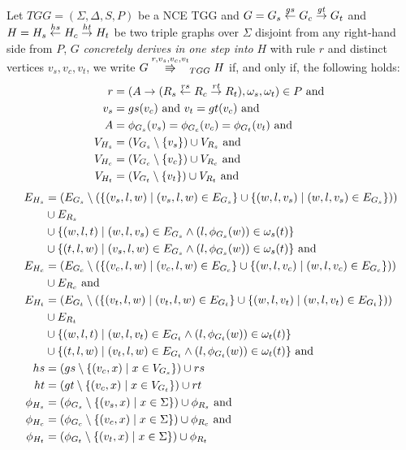 \begin{definition}
	\label{def:tgg_dstep}
	Let $TGG = (\Sigma, \Delta, S, P)$ be a NCE TGG and $G = G_s \overset{gs}{\leftarrow} G_c \overset{gt}{\rightarrow} G_t$ and $H = H_s \overset{hs}{\leftarrow} H_c \overset{ht}{\rightarrow} H_t$ be two triple graphs over $\Sigma$ disjoint from any right-hand side from $P$, $G$ \emph{concretely derives in one step into} $H$ with rule $r$ and distinct vertices $v_s, v_c, v_t$, we write $G \tcderiv{r}{v_s,v_c,v_t}{TGG} H$ if, and only if, the following holds:
	\begin{align*}
		r & = (A \to (R_s \overset{rs}{\leftarrow} R_c \overset{rt}{\rightarrow} R_t), \omega_s, \omega_t) \in P \text{ and } \\
		v_s & = gs(v_c) \text{ and } v_t = gt(v_c) \text{ and}\\
		A & = \phi_{G_s}(v_s) = \phi_{G_c}(v_c) = \phi_{G_t}(v_t) \text{ and} \\
		V_{H_s}  & = (V_{G_s} \setminus \{v_s\}) \cup V_{R_s} \text{ and}\\
		V_{H_c}  & = (V_{G_c} \setminus \{v_c\}) \cup V_{R_c} \text{ and} \\
		V_{H_t}  & = (V_{G_t} \setminus \{v_t\}) \cup V_{R_t} \text{ and}
		\end{align*}
		\begin{align*}
		E_{H_s} & = (E_{G_s} \setminus (\{(v_s,l,w) \; | \; (v_s,l,w) \in E_{G_s}\} \cup \{(w,l,v_s) \; | \; (w,l,v_s) \in E_{G_s}\})) \\
		& \cup E_{R_s} \\
		& \cup \{(w,l,t) \; | \; (w,l,v_s) \in E_{G_s} \land (l,\phi_{G_s}(w)) \in \omega_{s}(t)\} \\
		& \cup \{(t,l,w) \; | \; (v_s,l,w) \in E_{G_s} \land (l,\phi_{G_s}(w)) \in \omega_{s}(t)\} \text{ and} \\
		E_{H_c} & = (E_{G_c} \setminus (\{(v_c,l,w) \; | \; (v_c,l,w) \in E_{G_c}\} \cup \{(w,l,v_c) \; | \; (w,l,v_c) \in E_{G_c}\})) \\
		& \cup E_{R_c} \text{ and} \\
		E_{H_t} & = (E_{G_t} \setminus (\{(v_t,l,w) \; | \; (v_t,l,w) \in E_{G_t}\} \cup \{(w,l,v_t) \; | \; (w,l,v_t) \in E_{G_t}\})) \\
		& \cup E_{R_t} \\
		& \cup \{(w,l,t) \; | \; (w,l,v_t) \in E_{G_t} \land (l,\phi_{G_t}(w)) \in \omega_{t}(t)\} \\
		& \cup \{(t,l,w) \; | \; (v_t,l,w) \in E_{G_t} \land (l,\phi_{G_t}(w)) \in \omega_{t}(t)\} \text{ and} \\
		hs		& = (gs \setminus \{(v_c,x) \; | \; x \in V_{G_s}\}) \cup rs  \\
		ht		& = (gt \setminus \{(v_c,x) \; | \; x \in V_{G_t}\}) \cup rt  \\
		\phi_{H_s} & = (\phi_{G_s} \setminus \{(v_s,x) \; | \; x \in \Sigma\}) \cup \phi_{R_s} \text{ and}\\
		\phi_{H_c} & = (\phi_{G_c} \setminus \{(v_c,x) \; | \; x \in \Sigma\}) \cup \phi_{R_c} \text{ and}\\
		\phi_{H_t} & = (\phi_{G_t} \setminus \{(v_t,x) \; | \; x \in \Sigma\}) \cup \phi_{R_t}\\
	\end{align*}
\end{definition}

